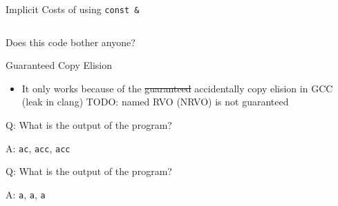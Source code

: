 \documentclass[compress,aspectratio=1610]{beamer}
\newcommand{\inputcpplisting}[1]{}
\newcommand{\inputasmlisting}[1]{}
\begin{document}
\begin{frame}[fragile]{Implicit Costs of using \texttt{const \&}}
    \begin{columns}[t]
        \begin{column}{.45\textwidth}
            \inputasmlisting{snippet1b}
        \end{column}
        \begin{column}{.45\textwidth}
            \inputasmlisting{snippet2b}
        \end{column}
    \end{columns}
\end{frame}

\begin{frame}[fragile]
    \inputcpplisting{snippet8}
\end{frame}

\begin{frame}[fragile]{Does this code bother anyone?}
    \inputcpplisting{snippet3}
\end{frame}

\begin{frame}{Guaranteed Copy Elision}
    \begin{itemize}
        \item It only works because of the \st{guaranteed} accidentally copy elision in GCC (leak in clang) TODO: named RVO (NRVO) is not guaranteed
    \end{itemize}
\end{frame}

\begin{frame}[fragile]{Q: What is the output of the program?}
    \inputcpplisting{snippet4a}
\end{frame}

\begin{frame}[fragile]{A: \texttt{ac}, \texttt{acc}, \texttt{acc}}
    \inputcpplisting{snippet4a}
\end{frame}

\begin{frame}[fragile]{Q: What is the output of the program?}
    \inputcpplisting{snippet4b}
\end{frame}

\begin{frame}[fragile]{A: \texttt{a}, \texttt{a}, \texttt{a}}
    \inputcpplisting{snippet4b}
\end{frame}
\end{document}

